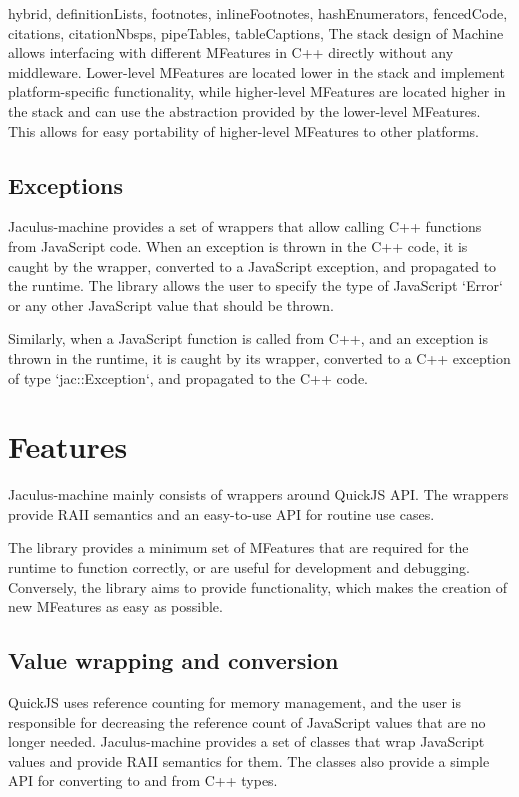 \begin{markdown*}{%
  hybrid,
  definitionLists,
  footnotes,
  inlineFootnotes,
  hashEnumerators,
  fencedCode,
  citations,
  citationNbsps,
  pipeTables,
  tableCaptions,
}
The stack design of Machine allows interfacing with different MFeatures in C++ directly without any middleware. Lower-level MFeatures are located lower in the stack and implement platform-specific functionality, while higher-level MFeatures are located higher in the stack and can use the abstraction provided by the lower-level MFeatures. This allows for easy portability of higher-level MFeatures to other platforms.

\subsection{Exceptions}

Jaculus-machine provides a set of wrappers that allow calling C++ functions from JavaScript code. When an exception is thrown in the C++ code, it is caught by the wrapper, converted to a JavaScript exception, and propagated to the runtime. The library allows the user to specify the type of JavaScript `Error` or any other JavaScript value that should be thrown.

Similarly, when a JavaScript function is called from C++, and an exception is thrown in the runtime, it is caught by its wrapper, converted to a C++ exception of type `jac::Exception`, and propagated to the C++ code.


\section{Features}

Jaculus-machine mainly consists of wrappers around QuickJS API. The wrappers provide RAII semantics and an easy-to-use API for routine use cases.

The library provides a minimum set of MFeatures that are required for the runtime to function correctly, or are useful for development and debugging. Conversely, the library aims to provide functionality, which makes the creation of new MFeatures as easy as possible.


\subsection{Value wrapping and conversion}

QuickJS uses reference counting for memory management, and the user is responsible for decreasing the reference count of JavaScript values that are no longer needed. Jaculus-machine provides a set of classes that wrap JavaScript values and provide RAII semantics for them. The classes also provide a simple API for converting to and from C++ types.


\end{markdown*}
